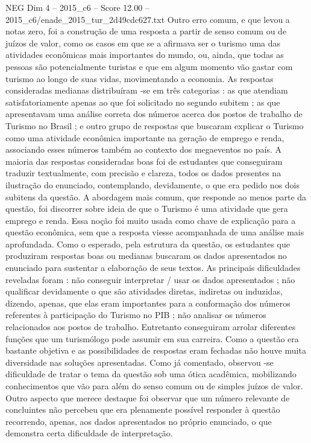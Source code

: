 \begin{textsample}{NEG Dim 4 – 2015\_c6 – Score 12.00 – 2015\_c6/enade\_2015\_tur\_2d49cdc627.txt}
Outro erro comum, e que levou a notas zero, foi a construção de uma resposta a partir de senso comum ou de juízos de valor, como os casos em que se a afirmava ser o turismo uma das atividades econômicas mais importantes do mundo, ou, ainda, que todas as pessoas são potencialmente turistas e que em algum momento vão gastar com turismo ao longo de suas vidas, movimentando a economia.
As respostas consideradas medianas distribuíram -se em três categorias : as que atendiam satisfatoriamente apenas ao que foi solicitado no segundo subitem ; as que apresentavam uma análise correta dos números acerca dos postos de trabalho de Turismo no Brasil ; e outro grupo de respostas que buscaram explicar o Turismo como uma atividade econômica importante na geração de emprego e renda, associando esses números também ao contexto dos megaeventos no país.
A maioria das respostas consideradas boas foi de estudantes que conseguiram traduzir textualmente, com precisão e clareza, todos os dados presentes na ilustração do enunciado, contemplando, devidamente, o que era pedido nos dois subitens da questão.
A abordagem mais comum, que responde ao menos parte da questão, foi discorrer sobre ideia de que o Turismo é uma atividade que gera emprego e renda.
Essa noção foi muito usada como chave de explicação para a questão econômica, sem que a resposta viesse acompanhada de uma análise mais aprofundada.
Como o esperado, pela estrutura da questão, os estudantes que produziram respostas boas ou medianas buscaram os dados apresentados no enunciado para sustentar a elaboração de seus textos.
As principais dificuldades reveladas foram : não conseguir interpretar / usar os dados apresentados ; não qualificar devidamente o que são atividades diretas, indiretas ou induzidas, dizendo, apenas, que elas eram importantes para a conformação dos números referentes à participação do Turismo no PIB ; não analisar os números relacionados aos postos de trabalho.
Entretanto conseguiram arrolar diferentes funções que um turismólogo pode assumir em sua carreira.
Como a questão era bastante objetiva e as possibilidades de respostas eram fechadas não houve muita diversidade nas soluções apresentadas.
Como já comentado, observou -se dificuldade de tratar o tema da questão sob uma ótica acadêmica, mobilizando conhecimentos que vão para além do senso comum ou de simples juízos de valor.
Outro aspecto que merece destaque foi observar que um número relevante de concluintes não percebeu que era plenamente possível responder à questão recorrendo, apenas, aos dados apresentados no próprio enunciado, o que demonstra certa dificuldade de interpretação.

\end{textsample}
